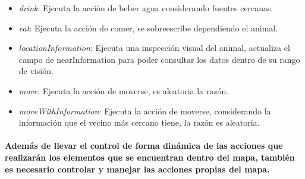 \begin{itemize}
\begin{itemize}
            \item{\textit{drink}: Ejecuta la acción de beber agua considerando fuentes cercanas.}
            \item{\textit{eat}: Ejecuta la acción de comer, se sobreescribe dependiendo el animal.}
            \item{\textit{locationInformation}: Ejecuta una inspección visual del animal, actualiza el campo de nearInformation para poder consultar los datos dentro de su rango de visión.}
            \item{\textit{move}: Ejecuta la acción de moverse, es aleatoria la razón.}
            \item{\textit{moveWithInformation}: Ejecuta la acción de moverse, considerando la información que el vecino más cercano tiene, la razón es aleatoria.}
          \end{itemize}        
      \end{itemize}
    \paragraph{Además de llevar el control de forma dinámica de las acciones que realizarán los elementos que se encuentran dentro del mapa, también es necesario controlar y manejar las acciones propias del mapa.}
